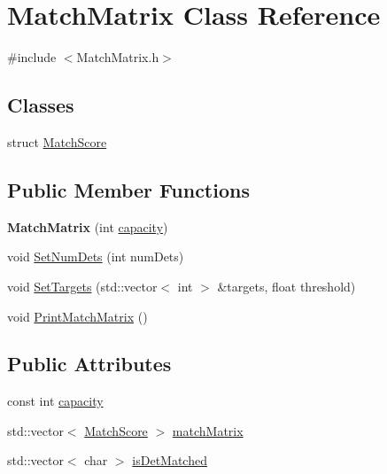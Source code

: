 \hypertarget{classMatchMatrix}{}\section{Match\+Matrix Class Reference}
\label{classMatchMatrix}


{\ttfamily \#include $<$Match\+Matrix.\+h$>$}

\subsection*{Classes}
\begin{DoxyCompactItemize}
\item 
struct \hyperlink{structMatchMatrix_1_1MatchScore}{Match\+Score}
\end{DoxyCompactItemize}
\subsection*{Public Member Functions}
\begin{DoxyCompactItemize}
\item 
\hypertarget{classMatchMatrix_a7d879e8c199fb12bdf820d0ddf4989bd}{}{\bfseries Match\+Matrix} (int \hyperlink{classMatchMatrix_aea0cf328c2400c73e0146d9e68e310d9}{capacity})\label{classMatchMatrix_a7d879e8c199fb12bdf820d0ddf4989bd}

\item 
void \hyperlink{classMatchMatrix_acec2501fa6829ffc411d6a28f81a9fd4}{Set\+Num\+Dets} (int num\+Dets)
\item 
void \hyperlink{classMatchMatrix_a34460be87975b20a17bbe4931c842093}{Set\+Targets} (std\+::vector$<$ int $>$ \&targets, float threshold)
\item 
void \hyperlink{classMatchMatrix_a89f3a9ba25e87097b7c68aea556270ba}{Print\+Match\+Matrix} ()
\end{DoxyCompactItemize}
\subsection*{Public Attributes}
\begin{DoxyCompactItemize}
\item 
const int \hyperlink{classMatchMatrix_aea0cf328c2400c73e0146d9e68e310d9}{capacity}
\item 
std\+::vector$<$ \hyperlink{structMatchMatrix_1_1MatchScore}{Match\+Score} $>$ \hyperlink{classMatchMatrix_a79a0696b5718167910fdc83cb63da755}{match\+Matrix}
\item 
std\+::vector$<$ char $>$ \hyperlink{classMatchMatrix_ae0739695c34fa591511ed653bc2f5173}{is\+Det\+Matched}
\end{DoxyCompactItemize}


